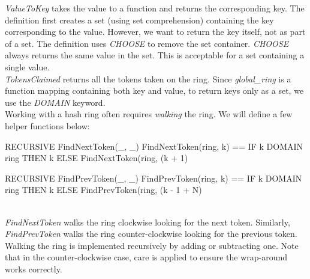 \textit{ValueToKey} takes the value to a function and returns the corresponding
key. The definition first creates a set (using set comprehension) containing the
key corresponding to the value. However, we want to return the key itself,
not as part of a set. The definition uses \textit{CHOOSE} to remove the set
container. \textit{CHOOSE} always returns the same value in the set. This is
acceptable for a set containing a single value.\\

\textit{TokensClaimed} returns all the tokens taken on the ring. Since
\textit{global\_ring} is a function mapping containing both key and value, to
return keys only as a set, we use the \textit{DOMAIN} keyword.\\

Working with a hash ring often requires \textit{walking} the ring. We will
define a few helper functions below:\\

\begin{tla}
RECURSIVE FindNextToken(_, _)
FindNextToken(ring, k) ==
    IF k \in DOMAIN ring THEN
        k 
    ELSE 
        FindNextToken(ring, (k + 1) %

RECURSIVE FindPrevToken(_, _)
FindPrevToken(ring, k) ==
    IF k \in DOMAIN ring THEN
        k
    ELSE 
        FindPrevToken(ring, (k - 1 + N) %
\end{tla}
\begin{tlatex}
%
%
%
%
%
%
\@pvspace{8.0pt}%
%
%
%
%
%
%
\end{tlatex}
\\

\textit{FindNextToken} walks the ring clockwise looking for the next token.
Similarly, \textit{FindPrevToken} walks the ring counter-clockwise looking for the
previous token. Walking the ring is implemented recursively by adding or 
subtracting one. Note that in the counter-clockwise case, care is applied to
ensure the wrap-around works correctly.\\

